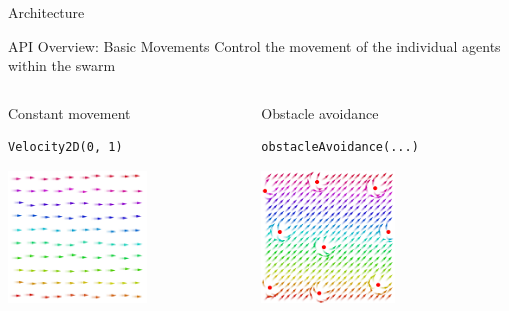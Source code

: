 \documentclass[presentation, 9pt]{beamer}\mode<presentation>{\usetheme{AMSBolognaFC}}
\begin{document}
\begin{frame}{Architecture}
\centering
{}
\end{frame}
\begin{frame}[fragile]{API Overview: Basic Movements}
\centering
Control the movement of the individual agents within the swarm
\begin{columns}
	\begin{column}[t]{0.3\textwidth}
		\begin{exampleblock}{Constant movement}
		\begin{verbatim}
Velocity2D(0, 1)
		\end{verbatim}
		\includegraphics[height=3.5cm]{img/constant-movement.png}
		\end{exampleblock}
	\end{column}
	\begin{column}[t]{0.3\textwidth}
		\begin{exampleblock}{Obstacle avoidance}
		\begin{verbatim}
obstacleAvoidance(...)
		\end{verbatim}
		\centering
		\includegraphics[height=3.5cm]{img/obstracle.png}
		

\end{exampleblock}
\end{column}
\end{columns}
\end{frame}
\end{document}

